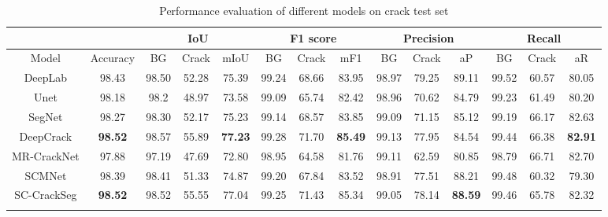 \documentclass[a4paper,12pt]{report}
\begin{document}
    \begin{table}[htbp]
        \begin{adjustbox}{width=\columnwidth,center}
            \begin{tabular}{|c|c|c|c|c|c|c|c|c|c|c|c|c|c|}
            \hline
            & & \multicolumn{3}{|c|}{\textbf{IoU}} & \multicolumn{3}{|c|}{\textbf{F1 score}} & \multicolumn{3}{|c|}{\textbf{Precision}} & \multicolumn{3}{|c|}{\textbf{Recall}}\\
            \hline
            {Model} & {Accuracy} & {BG} & {Crack} & {mIoU} & {BG} & {Crack} & {mF1} & {BG} & {Crack} & {aP} & {BG} & {Crack} & {aR}\\
            \hline
            {DeepLab \cite{chen2018encoder}} & {98.43} & {98.50} & {52.28} & {75.39} & {99.24} & {68.66} & {83.95} & {98.97} & {79.25} & {89.11} & {99.52} & {60.57} & {80.05}\\
            \hline
            {Unet \cite{}} & {98.18} & {98.2} & {48.97} & {73.58} & {99.09} & {65.74} & {82.42} & {98.96} & {70.62} & {84.79} & {99.23} & {61.49} & {80.20}\\
            \hline
            {SegNet\cite{chen_pavement_2020}} & {98.27} & {98.30} & {52.17} & {75.23} & {99.14} & {68.57} & {83.85} & {99.09} & {71.15} & {85.12} & {99.19} & {66.17} & {82.63}\\
            \hline
            {DeepCrack\cite{liu2019deepcrack}} & \textbf{98.52} & {98.57} & {55.89} & \textbf{77.23} & {99.28} & {71.70} & \textbf{85.49} & {99.13} & {77.95} & {84.54} & {99.44} & {66.38} & \textbf{82.91}\\
            \hline
            {MR-CrackNet\cite{nayyeri2021multi}} & {97.88} & {97.19} & {47.69} & {72.80} & {98.95} & {64.58} & {81.76} & {99.11} & {62.59} & {80.85} & {98.79} & {66.71} & {82.70}\\
            \hline
            {SCMNet\cite{singha2021scmnet}} & {98.39} & {98.41} & {51.33} & {74.87} & {99.20} & {67.84} & {83.52} & {98.91} & {77.51} & {88.21} & {99.48} & {60.32} & {79.30}\\
            \hline
            {SC-CrackSeg} & \textbf{98.52} & {98.52} & {55.55} & {77.04} & {99.25} & {71.43} & {85.34} & {99.05} & {78.14} & \textbf{88.59} & {99.46} & {65.78} & {82.32}\\
            \hline
            \multicolumn{11}{l}{}
            \end{tabular}
        \end{adjustbox}
        \caption{Performance evaluation of different models on crack test set}%
    \end{table}
\end{document}
